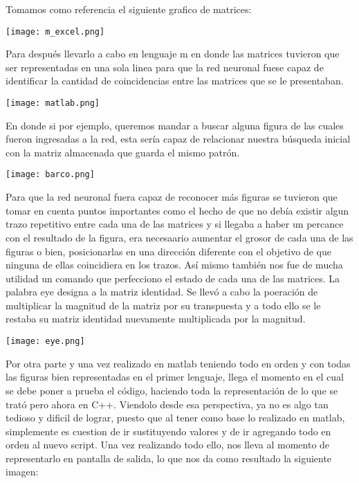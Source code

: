 \documentclass{report}
\begin{document}
{\large Tomamos como referencia el siguiente grafico de matrices: 

 \texttt{[image: m\_excel.png]}
 
 Para después llevarlo a cabo en lenguaje m en donde las matrices tuvieron que ser representadas en una sola linea para que la red neuronal fuese capaz de identificar la cantidad de coincidencias entre las matrices que se le presentaban.
 
 \texttt{[image: matlab.png]}
 
\vspace{0.5}
 En donde si por ejemplo, queremos mandar a buscar alguna figura de las cuales fueron ingresadas a la red, esta sería capaz de relacionar nuestra b\'usqueda inicial con la matriz almacenada que guarda el mismo patr\'on.
 
 \texttt{[image: barco.png]}

Para que la red neuronal fuera capaz de reconocer más figuras se tuvieron que tomar en cuenta puntos importantes como el hecho de que no debía existir algun trazo repetitivo entre cada una de las matrices y si llegaba a haber un percance con el resultado de la figura, era necesaario aumentar el grosor de cada una de las figuras o bien, posicionarlas en una dirección diferente con el objetivo de que ninguna de ellas coincidiera en los trazos. Así mismo también nos fue de mucha utilidad un comando que perfecciono el estado de cada una de las matrices.
La palabra eye designa a la matriz identidad. Se llevó a cabo la poeración de multiplicar la magnitud de la matriz por su transpuesta y a todo ello se le restaba su matriz identidad nuevamente multiplicada por la magnitud. 

\texttt{[image: eye.png]}
 
\vspace{1.5} 

Por otra parte y una vez realizado en matlab teniendo todo en orden y con todas las figuras bien representadas en el primer lenguaje, llega el momento en el cual se debe poner a prueba el código, haciendo toda la representación de lo que se trató pero ahora en C++. Viendolo desde esa perspectiva, ya no es algo tan tedioso y dificil de lograr, puesto que al tener como base lo realizado en matlab, simplemente es cuestion de ir sustituyendo valores y de ir agregando todo en orden al nuevo script. Una vez realizando todo ello, nos lleva al momento de representarlo en pantalla de salida, lo que nos da como resultado la siguiente imagen: 

}
\end{document}
